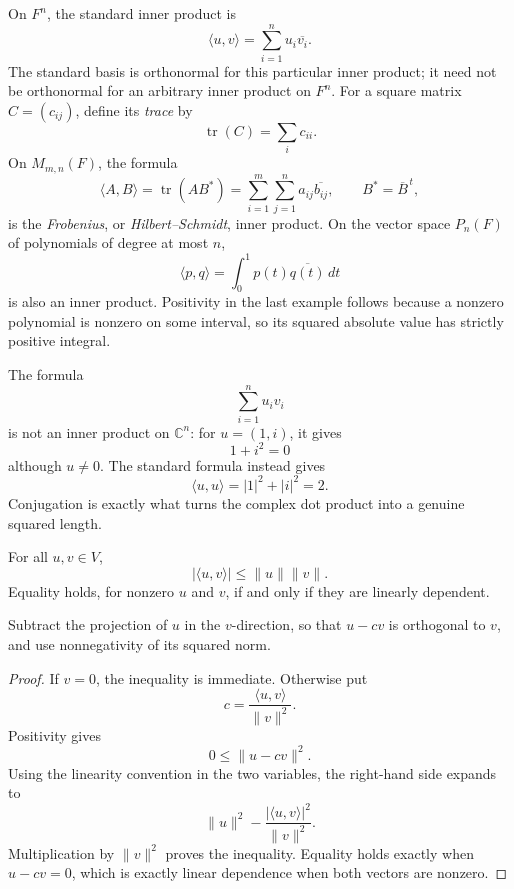 \begin{example}
On \(F^n\), the standard inner product is
\[
\langle u,v\rangle=\sum_{i=1}^n u_i\overline{v_i}.
\]
The standard basis is orthonormal for this particular inner product; it need
not be orthonormal for an arbitrary inner product on \(F^n\).
For a square matrix \(C=(c_{ij})\), define its \emph{trace} by
\[
\operatorname{tr}(C)=\sum_i c_{ii}.
\]
On \(M_{m,n}(F)\), the formula
\[
\langle A,B\rangle=\operatorname{tr}(AB^*)
=\sum_{i=1}^m\sum_{j=1}^n a_{ij}\overline{b_{ij}},
\qquad B^*=\overline B^{\,t},
\]
is the \emph{Frobenius}, or \emph{Hilbert--Schmidt}, inner product. On the
vector space \(P_n(F)\) of polynomials of degree
at most \(n\),
\[
\langle p,q\rangle=\int_0^1p(t)\overline{q(t)}\,dt
\]
is also an inner product. Positivity in the last example follows because a
nonzero polynomial is nonzero on some interval, so its squared absolute value
has strictly positive integral.
\end{example}

\begin{example}
The formula
\[
\sum_{i=1}^n u_iv_i
\]
is not an inner product on \(\mathbb C^n\): for \(u=(1,i)\), it gives
\[
1+i^2=0
\]
although \(u\ne0\). The standard formula instead gives
\[
\langle u,u\rangle=|1|^2+|i|^2=2.
\]
Conjugation is exactly what turns the complex dot product into a genuine
squared length.
\end{example}

\begin{theorem}
For all \(u,v\in V\),
\[
|\langle u,v\rangle|\leq\lVert u\rVert\lVert v\rVert.
\]
Equality holds, for nonzero \(u\) and \(v\), if and only if they are linearly
dependent.
\end{theorem}
\begin{proofidea}
Subtract the projection of \(u\) in the \(v\)-direction, so that \(u-cv\)
is orthogonal to \(v\), and use nonnegativity of its squared norm.
\end{proofidea}
\begin{proof}
If \(v=0\), the inequality is immediate. Otherwise put
\[
c=\frac{\langle u,v\rangle}{\lVert v\rVert^2}.
\]
Positivity gives
\[
0\leq\lVert u-cv\rVert^2.
\]
Using the linearity convention in the two variables, the right-hand side
expands to
\[
\lVert u\rVert^2
-\frac{|\langle u,v\rangle|^2}{\lVert v\rVert^2}.
\]
Multiplication by \(\lVert v\rVert^2\) proves the inequality. Equality
holds exactly when \(u-cv=0\), which is exactly linear dependence when both
vectors are nonzero.
\end{proof}

